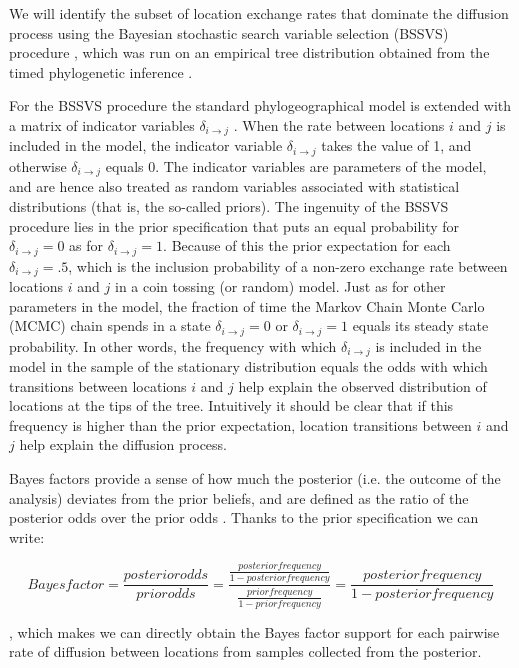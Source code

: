 \documentclass[english]{paper}
\begin{document}
We will identify the subset of location exchange rates that dominate the diffusion process using the Bayesian stochastic search variable selection (BSSVS) procedure \citep{lemey:2009fk}, which was run on an empirical tree distribution obtained from the timed phylogenetic inference \citep{Lemey:2014aa}. 
\par
For the BSSVS procedure the standard phylogeographical model is extended with a matrix of indicator variables $\delta_{i{\rightarrow}j}$ \citep{lemey:2009fk}.
When the rate between locations $i$ and $j$ is included in the model, the indicator variable $\delta_{i{\rightarrow}j}$ takes the value of 1, and otherwise $\delta_{i{\rightarrow}j}$ equals 0.
The indicator variables are parameters of the model, and are hence also treated as random variables associated with statistical distributions (that is, the so-called priors).
The ingenuity of the BSSVS procedure lies in the prior specification that puts an equal probability for $\delta_{i{\rightarrow}j} = 0$ as for $\delta_{i{\rightarrow}j} = 1$. 
Because of this the prior expectation for each $\delta_{i{\rightarrow}j} = .5$, which is the inclusion probability of a non-zero exchange rate between locations $i$ and $j$ in a coin tossing (or random) model.
Just as for other parameters in the model, the fraction of time the Markov Chain Monte Carlo (MCMC) chain spends in a state $\delta_{i{\rightarrow}j} = 0$ or $\delta_{i{\rightarrow}j} = 1$ equals its steady state probability.
In other words, the frequency with which $\delta_{i{\rightarrow}j}$ is included in the model in the sample of the stationary distribution equals the odds with which transitions between locations $i$ and $j$ help explain the observed distribution of locations at the tips of the tree.
Intuitively it should be clear that if this frequency is higher than the prior expectation, location transitions between $i$ and $j$ help explain the diffusion process.
\par
Bayes factors provide a sense of how much the posterior (i.e. the outcome of the analysis) deviates from the prior beliefs, and are defined as the ratio of the posterior odds over the prior odds \citep{kass:1995a}.
Thanks to the prior specification we can write:

$$ Bayes factor = \frac{posterior odds}{prior odds} = \frac{\frac{posterior frequency}{1 - posterior frequency}}{\frac{prior frequency}{1 - prior frequency}} = \frac{posterior frequency}{1 - posterior frequency}$$

, which makes we can directly obtain the Bayes factor support for each pairwise rate of diffusion between locations from samples collected from the posterior. 
\end{document}
